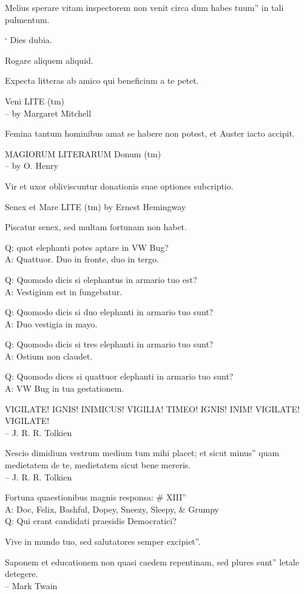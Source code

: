 \documentclass[titlepage,12pt]{memoir}
\begin{document}
Melius sperare vitam inspectorem non venit circa dum habes tuum”
in tali pulmentum.

‘ Dies dubia.

Rogare aliquem aliquid.

Expecta litteras ab amico qui beneficium a te petet.

Veni LITE (tm)
\\-- by Margaret Mitchell

Femina tantum hominibus amat se habere non potest, et Auster iacto accipit.

MAGIORUM LITERARUM Donum (tm)
\\-- by O. Henry

Vir et uxor obliviscuntur donationis suae optiones subcriptio.

Senex et Mare LITE (tm)
by Ernest Hemingway

Piscatur senex, sed multam fortunam non habet.

Q: quot elephanti potes aptare in VW Bug?\\
A: Quattuor. Duo in fronte, duo in tergo.

Q: Quomodo dicis si elephantus in armario tuo est?\\
A: Vestigium est in fungebatur.

Q: Quomodo dicis si duo elephanti in armario tuo sunt?\\
A: Duo vestigia in mayo.

Q: Quomodo dicis si tres elephanti in armario tuo sunt?\\
A: Ostium non claudet.

Q: Quomodo dices si quattuor elephanti in armario tuo sunt?\\
A: VW Bug in tua gestationem.

VIGILATE! IGNIS! INIMICUS! VIGILIA!
TIMEO! IGNIS! INIM!
VIGILATE! VIGILATE!
\\-- J. R. R. Tolkien

Nescio dimidium vestrum medium tum mihi placet; et sicut minus”
quam medietatem de te, medietatem sicut bene mereris.
\\-- J. R. R. Tolkien

Fortuna quaestionibus magnis responsa: \# XIII”\\
A: Doc, Felix, Bashful, Dopey, Sneezy, Sleepy, \& Grumpy
\\Q: Qui erant candidati praesidis Democratici?

Vive in mundo tuo, sed salutatores semper excipiet”.

Saponem et educationem non quasi caedem repentinam, sed plures sunt”
letale detegere.
\\-- Mark Twain
\end{document}
